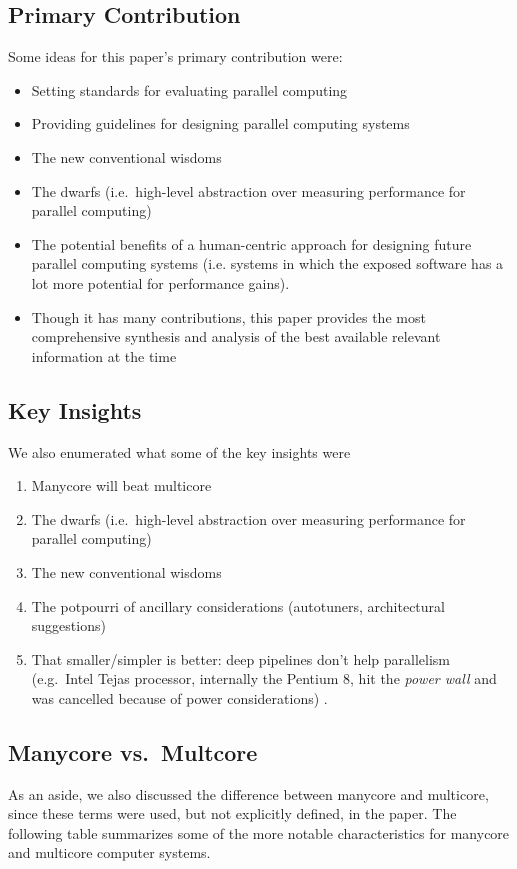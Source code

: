 \subsection{Primary Contribution}\label{feb-11:a-view:contribution}
Some ideas for this paper's primary contribution were:
\begin{itemize}
    \item Setting standards for evaluating parallel computing
    \item Providing guidelines for designing parallel computing systems
    \item The new conventional wisdoms
    \item The dwarfs (i.e.\ high-level abstraction over measuring performance for parallel computing)
    \item The potential benefits of a human-centric approach for designing future parallel computing systems (i.e. systems in which the exposed software has a lot more potential for performance gains).
    \item Though it has many contributions, this paper provides the most comprehensive synthesis and analysis of the best available relevant information at the time
\end{itemize}

\subsection{Key Insights}\label{feb-11:a-view:insights}

We also enumerated what some of the key insights were
\begin{enumerate}
    \item Manycore will beat multicore
    \item The dwarfs (i.e.\ high-level abstraction over measuring performance for parallel computing)
    \item The new conventional wisdoms
    \item The potpourri of ancillary considerations (autotuners, architectural suggestions)
    \item That smaller/simpler is better: deep pipelines don't help parallelism (e.g.\ Intel Tejas processor, internally the Pentium 8, hit the \textit{power wall} and was cancelled because of power considerations) \cite{Tejas}.
\end{enumerate}

\subsection{Manycore vs.\ Multcore}\label{feb-11:a-view:many-vs-multi}
As an aside, we also discussed the difference between manycore and multicore, since these terms were used, but not explicitly defined, in the paper. The following table summarizes some of the more notable characteristics for manycore and multicore computer systems.

